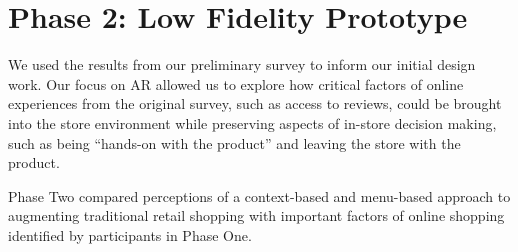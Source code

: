 \section{Phase 2: Low Fidelity Prototype}
We used the results from our preliminary survey to inform our initial design work. Our focus on AR allowed us to explore how critical factors of online experiences from the original survey, such as access to reviews, could be brought into the store environment while preserving aspects of in-store decision making, such as being ``hands-on with the product'' and leaving the store with the product. 

\begin{marginfigure}
	\begin{minipage}{\marginparwidth}
			\centering
			\vfill
		\caption{Phase Two compared perceptions of a context-based and menu-based approach to augmenting traditional retail shopping with important factors of online shopping identified by participants in Phase One. }
	\end{minipage}
\end{marginfigure}

